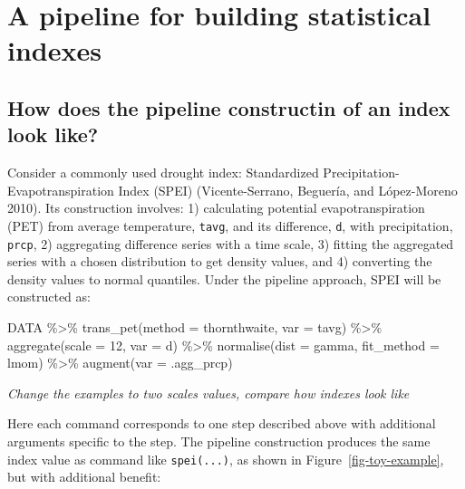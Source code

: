 \documentclass[
]{article}
\newenvironment{Shaded}{\begin{snugshade}}{\end{snugshade}}
\newcommand{\AttributeTok}[1]{\textcolor[rgb]{0.40,0.45,0.13}{#1}}
\newcommand{\DecValTok}[1]{\textcolor[rgb]{0.68,0.00,0.00}{#1}}
\newcommand{\FunctionTok}[1]{\textcolor[rgb]{0.28,0.35,0.67}{#1}}
\newcommand{\NormalTok}[1]{\textcolor[rgb]{0.00,0.23,0.31}{#1}}
\newcommand{\SpecialCharTok}[1]{\textcolor[rgb]{0.37,0.37,0.37}{#1}}
\begin{document}
\hypertarget{sec-a-pipeline-for-building-statistical-indexes}{%
\section{A pipeline for building statistical
indexes}\label{sec-a-pipeline-for-building-statistical-indexes}}

\hypertarget{how-does-the-pipeline-constructin-of-an-index-look-like}{%
\subsection{How does the pipeline constructin of an index look
like?}\label{how-does-the-pipeline-constructin-of-an-index-look-like}}

Consider a commonly used drought index: Standardized
Precipitation-Evapotranspiration Index (SPEI) (Vicente-Serrano,
Beguería, and López-Moreno 2010). Its construction involves: 1)
calculating potential evapotranspiration (PET) from average temperature,
\texttt{tavg}, and its difference, \texttt{d}, with precipitation,
\texttt{prcp}, 2) aggregating difference series with a time scale, 3)
fitting the aggregated series with a chosen distribution to get density
values, and 4) converting the density values to normal quantiles. Under
the pipeline approach, SPEI will be constructed as:

\begin{Shaded}
\begin{Highlighting}[]
\NormalTok{DATA }\SpecialCharTok{\%\textgreater{}\%} 
  \FunctionTok{trans\_pet}\NormalTok{(}\AttributeTok{method =}\NormalTok{ thornthwaite, }\AttributeTok{var =}\NormalTok{ tavg) }\SpecialCharTok{\%\textgreater{}\%} 
  \FunctionTok{aggregate}\NormalTok{(}\AttributeTok{scale =} \DecValTok{12}\NormalTok{, }\AttributeTok{var =}\NormalTok{ d) }\SpecialCharTok{\%\textgreater{}\%} 
  \FunctionTok{normalise}\NormalTok{(}\AttributeTok{dist =}\NormalTok{ gamma, }\AttributeTok{fit\_method =}\NormalTok{ lmom) }\SpecialCharTok{\%\textgreater{}\%} 
  \FunctionTok{augment}\NormalTok{(}\AttributeTok{var =}\NormalTok{ .agg\_prcp)}
\end{Highlighting}
\end{Shaded}

\emph{Change the examples to two scales values, compare how indexes look
like}

Here each command corresponds to one step described above with
additional arguments specific to the step. The pipeline construction
produces the same index value as command like \texttt{spei(...)}, as
shown in Figure~\ref{fig-toy-example}, but with additional benefit:
\end{document}
